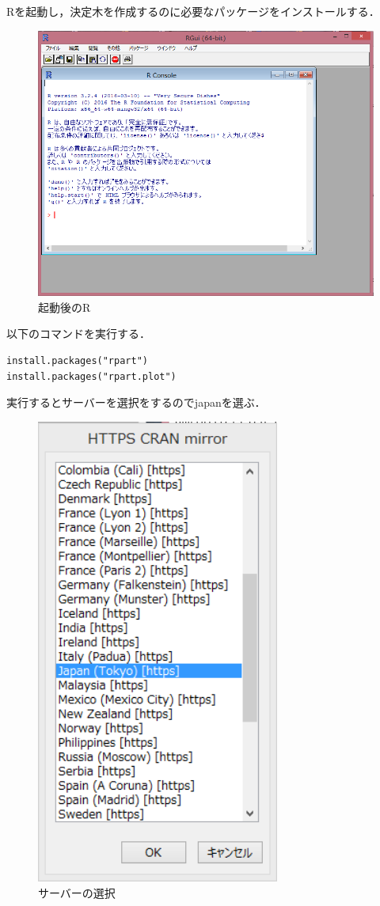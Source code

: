 Rを起動し，決定木を作成するのに必要なパッケージをインストールする．
\begin{figure}[H]
\centering
\includegraphics[width=16cm]{R5.PNG}
\caption{起動後のR}\label{サンプル図}
\end{figure}

以下のコマンドを実行する．
\begin{verbatim}
install.packages("rpart")
install.packages("rpart.plot")
\end{verbatim}

\newpage
実行するとサーバーを選択をするのでjapanを選ぶ．

\begin{figure}[H]
\centering
\includegraphics[width=8cm]{R6.PNG}
\caption{サーバーの選択}\label{サンプル図}
\end{figure}

